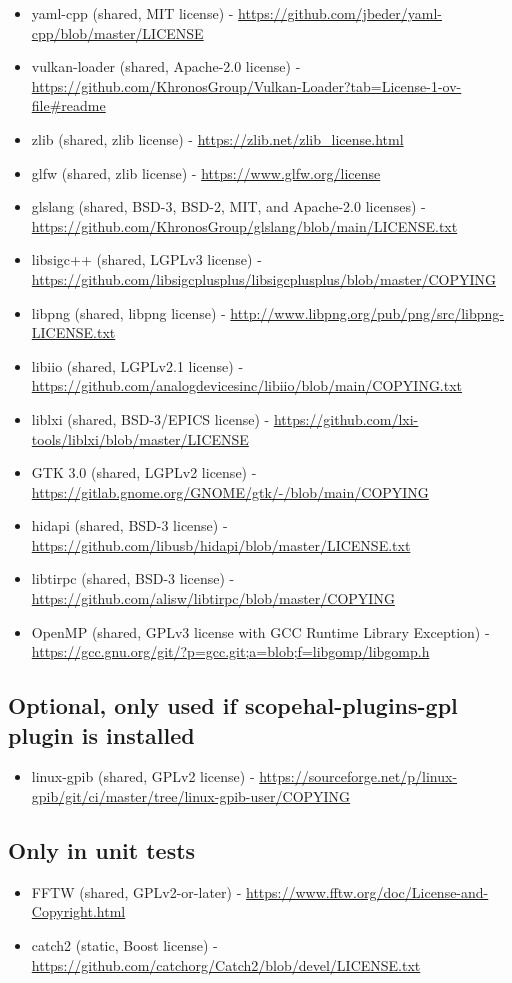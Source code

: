 \begin{itemize}
\item yaml-cpp (shared, MIT license) - \url{https://github.com/jbeder/yaml-cpp/blob/master/LICENSE}
\item vulkan-loader (shared, Apache-2.0 license) - \url{https://github.com/KhronosGroup/Vulkan-Loader?tab=License-1-ov-file#readme}
\item zlib (shared, zlib license) - \url{https://zlib.net/zlib_license.html}
\item glfw (shared, zlib license) - \url{https://www.glfw.org/license}
\item glslang (shared, BSD-3, BSD-2, MIT, and Apache-2.0 licenses) - \url{https://github.com/KhronosGroup/glslang/blob/main/LICENSE.txt}
\item libsigc++ (shared, LGPLv3 license) - \url{https://github.com/libsigcplusplus/libsigcplusplus/blob/master/COPYING}
\item libpng (shared, libpng license) - \url{http://www.libpng.org/pub/png/src/libpng-LICENSE.txt}
\item libiio (shared, LGPLv2.1 license) - \url{https://github.com/analogdevicesinc/libiio/blob/main/COPYING.txt}
\item liblxi (shared, BSD-3/EPICS license) - \url{https://github.com/lxi-tools/liblxi/blob/master/LICENSE}
\item GTK 3.0 (shared, LGPLv2 license) - \url{https://gitlab.gnome.org/GNOME/gtk/-/blob/main/COPYING}
\item hidapi (shared, BSD-3 license) - \url{https://github.com/libusb/hidapi/blob/master/LICENSE.txt}
\item libtirpc (shared, BSD-3 license) - \url{https://github.com/alisw/libtirpc/blob/master/COPYING}
\item OpenMP (shared, GPLv3 license with GCC Runtime Library Exception) - \url{https://gcc.gnu.org/git/?p=gcc.git;a=blob;f=libgomp/libgomp.h}
\end{itemize}

\subsection{Optional, only used if scopehal-plugins-gpl plugin is installed}
\begin{itemize}
\item linux-gpib (shared, GPLv2 license) - \url{https://sourceforge.net/p/linux-gpib/git/ci/master/tree/linux-gpib-user/COPYING}
\end{itemize}

\subsection{Only in unit tests}
\begin{itemize}
\item FFTW (shared, GPLv2-or-later) - \url{https://www.fftw.org/doc/License-and-Copyright.html}
\item catch2 (static, Boost license) - \url{https://github.com/catchorg/Catch2/blob/devel/LICENSE.txt}
\end{itemize}
